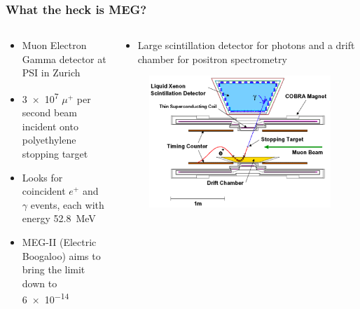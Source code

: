 \documentclass[11pt]{beamer}
\begin{document}
\begin{frame}
    \frametitle{What the heck is MEG?}
    \begin{columns}[t]
        \begin{column}{0.4\textwidth}
            \begin{itemize}
                \item Muon Electron Gamma detector at PSI in Zurich
                \item \num{3e7} $\mu^+$ per second beam incident onto polyethylene stopping target
                \item Looks for coincident $e^+$ and $\gamma$ events, each with energy \SI{52.8}{\mega\electronvolt}
                \item MEG-II {\footnotesize(Electric Boogaloo)} aims to bring the limit down to \num{6e-14}
            \end{itemize}
        \end{column}
    
        \begin{column}{0.6\textwidth}
            \begin{itemize}
                \item Large scintillation detector for photons and a drift chamber for positron spectrometry
            \end{itemize}
            \begin{figure}[h]
                \begin{center}
                    \includegraphics[width=.8\textwidth]{MEG.png}
                \end{center}
            \end{figure}
            
        \end{column}
    \end{columns}

    

\end{frame}
\end{document}
